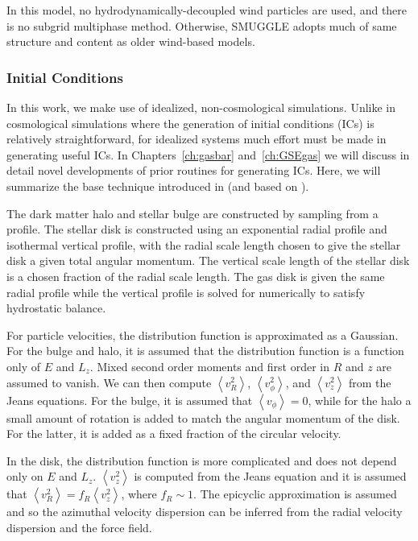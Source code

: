 In this model, no hydrodynamically-decoupled wind particles are used, and there is no subgrid multiphase method. Otherwise, SMUGGLE adopts much of same structure and content as older wind-based models.

\subsubsection{Initial Conditions}
In this work, we make use of idealized, non-cosmological simulations. Unlike in cosmological simulations where the generation of initial conditions (ICs) is relatively straightforward, for idealized systems much effort must be made in generating useful ICs. In Chapters~\ref{ch:gasbar} and~\ref{ch:GSEgas} we will discuss in detail novel developments of prior routines for generating ICs. Here, we will summarize the base technique introduced in \citet{2005MNRAS.361..776S} (and based on \citet{1993ApJS...86..389H,2000MNRAS.312..859S}).

The dark matter halo and stellar bulge are constructed by sampling from a \citet{1990ApJ...356..359H} profile. The stellar disk is constructed using an exponential radial profile and isothermal vertical profile, with the radial scale length chosen to give the stellar disk a given total angular momentum. The vertical scale length of the stellar disk is a chosen fraction of the radial scale length. The gas disk is given the same radial profile while the vertical profile is solved for numerically to satisfy hydrostatic balance.

For particle velocities, the distribution function is approximated as a Gaussian. For the bulge and halo, it is assumed that the distribution function is a function only of $E$ and $L_z$. Mixed second order moments and first order in $R$ and $z$ are assumed to vanish. We can then compute $\left<v_{R}^2\right>$, $\left<v_{\phi}^2\right>$, and $\left<v_{z}^2\right>$ from the Jeans equations. For the bulge, it is assumed that $\left<v_{\phi}\right>=0$, while for the halo a small amount of rotation is added to match the angular momentum of the disk. For the latter, it is added as a fixed fraction of the circular velocity.

In the disk, the distribution function is more complicated and does not depend only on $E$ and $L_z$. $\left<v_{z}^2\right>$ is computed from the Jeans equation and it is assumed that $\left<v_{R}^2\right> = f_R \left<v_{z}^2\right>$, where $f_R\sim1$. The epicyclic approximation is assumed and so the azimuthal velocity dispersion can be inferred from the radial velocity dispersion and the force field.

